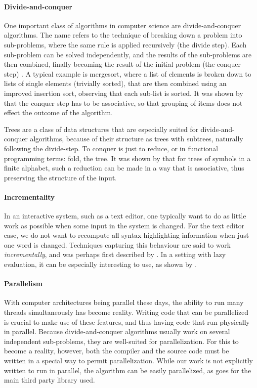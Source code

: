 \documentclass[a4paper,12pt,notitlepage]{report}
\renewcommand\cite{\citep}
\begin{document}
\paragraph{Divide-and-conquer} 
One important class of algorithms in computer science are divide-and-conquer 
algorithms. The name refers to the technique of breaking down a problem into
sub-problems, where the same rule is applied recursively (the divide step). Each
sub-problem can be solved independently, and the results of the sub-problems are
then combined, finally becoming the result of the initial problem (the conquer
step) \cite[p.209]{algorithmdesign}. A typical example is mergesort, where a
list of elements is broken down to lists of single elements (trivially sorted),
that are then combined using an improved insertion sort, observing that each
sub-list is sorted. It was shown by \citet{birdlists} that the conquer step has
to be associative, so that grouping of items does not effect the outcome of the
algorithm. 

Trees are a class of data structures that are especially suited for 
divide-and-conquer algorithms, because of their structure as trees with
subtrees, naturally following the divide-step. To conquer is just to reduce, or
in functional programming terms: fold, the tree. It was shown by
\citet{parparsepaper} that for trees of symbols in a finite alphabet, such a
reduction can be made in a way that is associative, thus preserving the
structure of the input. 

\paragraph{Incrementality}
In an interactive system, such as a text editor, one typically want to do as
little work as possible when some input in the system is changed. For the text
editor case, we do not want to recompute all syntax highlighting information when
just one word is changed. Techniques capturing this behaviour are said to work
\textit{incrementally}, and was perhaps first described by
\cite{incrementalpaper}. In a setting with lazy evaluation, it can be
especially interesting to use, as shown by \cite{lazyfunctional}.

\paragraph{Parallelism}
With computer architectures being parallel these days, the ability to run many
threads simultaneously has become reality. Writing code that can be parallelized
is crucial to make use of these features, and thus having code that run
physically in parallel. Because divide-and-conquer algorithms usually work on
several independent sub-problems, they are well-suited for parallelization. For
this to become a reality, however, both the compiler and the source code must be
written in a special way to permit parallelization. While our work is not
explicitly written to run in parallel, the algorithm can be easily parallelized,
as goes for the main third party library used. 
\end{document}
